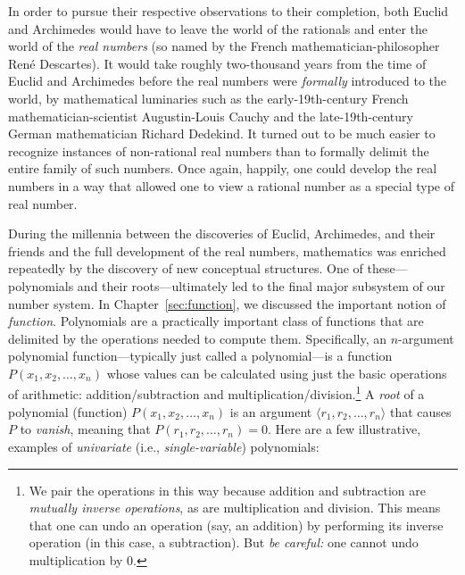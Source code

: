 In order to pursue their respective observations to their completion,
both Euclid and Archimedes would have to leave the world of the
rationals and enter the world of the {\it real numbers}
(so named by the French mathematician-philosopher Ren\'{e} Descartes).
It would take roughly two-thousand years from the time of Euclid and
Archimedes before the real numbers were {\em formally} introduced to
the world, by mathematical luminaries such as the early-19th-century
French mathematician-scientist Augustin-Louis Cauchy
and the late-19th-century German mathematician Richard Dedekind.
It turned out to be much easier to recognize instances of non-rational
real numbers than to formally delimit the entire family of such
numbers.  Once again, happily, one could develop the real numbers in a
way that allowed one to view a rational number as a special type of
real number.  

During the millennia between the discoveries of Euclid, Archimedes, and
their friends and the full development of the real numbers,
mathematics was enriched repeatedly by the discovery of new conceptual
structures.  One of these---polynomials
and their
%
roots---ultimately led to the final major subsystem of our number
system.  In Chapter~\ref{sec:function}, we discussed the important
notion of {\em function}.  Polynomials  are a
practically important class of functions that are delimited by the
operations needed to compute them.  Specifically, an $n$-argument
polynomial function---typically just called a polynomial---is a
function $P(x_1, x_2, \ldots, x_n)$ whose values can be calculated
using just the basic operations of arithmetic: addition/subtraction
and multiplication/division.\footnote{We pair the operations in this
  way because addition and subtraction are {\em mutually inverse
    operations},  as are
  multiplication and division.  This means that one can undo an
  operation (say, an addition) by performing its inverse operation (in
  this case, a subtraction).  But {\em be careful:} one cannot undo
  multiplication by $0$.}  A {\it root}  of a
polynomial (function) $P(x_1, x_2, \ldots, x_n)$ is an argument
$\langle r_1, r_2, \ldots, r_n \rangle$ that causes $P$ to {\it
  vanish}, meaning that $P(r_1, r_2, \ldots, r_n) = 0$.  Here are a
few illustrative, examples of {\em univariate} (i.e., {\em
  single-variable}) polynomials: 

